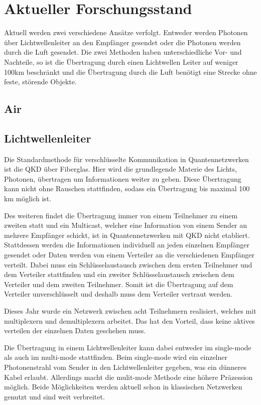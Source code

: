 \chapter{Aktueller Forschungsstand}

Aktuell werden zwei verschiedene Ansätze verfolgt.
Entweder werden Photonen über Lichtwellenleiter an den Empfänger gesendet oder die Photonen werden durch die Luft gesendet.
Die zwei Methoden haben unterschiedliche Vor- und Nachteile, so ist die Übertragung durch einen Lichtwellen Leiter auf weniger 100km beschränkt und die Übertragung durch die Luft benötigt eine Strecke ohne feste, störende Objekte.

\section{Air}
\section{Lichtwellenleiter}

Die Standardmethode für verschlüsselte Kommunikation in Quantennetzwerken ist die \ac{QKD} über Fiberglas.
Hier wird die grundlegende Materie des Lichts, Photonen, übertragen um Informationen weiter zu geben.
Diese Übertragung kann nicht ohne Rauschen stattfinden, sodass ein Übertragung bis maximal 100 km möglich ist\cite{Shen2018}.

Des weiteren findet die Übertragung immer von einem Teilnehmer zu einem zweiten statt und ein Multicast, welcher eine Information von einem Sender an mehrere Empfänger schickt, ist in Quantennetzwerken mit \ac{QKD} nicht etabliert.
Stattdessen werden die Informationen individuell an jeden einzelnen Empfänger gesendet oder Daten werden von einem Verteiler an die verschiedenen Empfänger verteilt.
Dabei muss ein Schlüsselaustausch zwischen dem ersten Teilnehmer und dem Verteiler stattfinden und ein zweiter Schlüsselaustausch zwischen dem Verteiler und dem zweiten Teilnehmer.
Somit ist die Übertragung auf dem Verteiler unverschlüsselt und deshalb muss dem Verteiler vertraut werden\cite{Qiu2018}.

Dieses Jahr wurde ein Netzwerk zwischen acht Teilnehmern realisiert, welches mit multiplexern und demultiplexern arbeitet.
Das hat den Vorteil, dass keine aktives verteilen der einzelnen Daten geschehen muss\cite{Siddarth2020}.

Die Übertragung in einem Lichtwellenleiter kann dabei entweder im single-mode als auch im multi-mode stattfinden.
Beim single-mode wird ein einzelner Photonenstrahl vom Sender in den Lichtwellenleiter gegeben, was ein dünneres Kabel erlaubt.
Allerdings macht die mulit-mode Methode eine höhere Präzession möglich\cite{VanMeter2014}.
Beide Möglichkeiten werden aktuell schon in klassischen Netzwerken genutzt und sind weit verbreitet.

